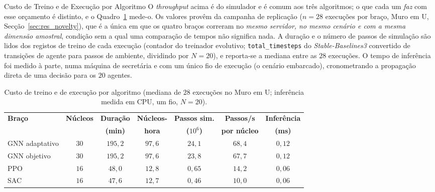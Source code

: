 \documentclass[12pt,reqno, twoside]{amsbook}
\makeatletter
\def\subsection{\@startsection{subsection}{2}%
      \z@{.5\linespacing\@plus.7\linespacing}{.25\linespacing}%
      {\normalfont\bfseries\flushleft}}
\theoremstyle{plain}
\numberwithin{equation}{chapter}
\numberwithin{section}{chapter}
\numberwithin{table}{chapter}
\numberwithin{figure}{chapter}
\makeatother
\begin{document}
\subsection{Custo de Treino e de Execução por Algoritmo}
\label{sec:res_custo_algos}
O \textit{throughput} acima é do simulador e é comum aos três algoritmos; o que cada um \emph{faz} com esse orçamento é distinto, e o Quadro~\ref{tab:res_tempos} mede-o. Os valores provêm da campanha de replicação ($n=28$ execuções por braço, Muro em U, Secção~\ref{sec:res_novelty}), que é a única em que os quatro braços correram no \emph{mesmo servidor, no mesmo cenário e com a mesma dimensão amostral}, condição sem a qual uma comparação de tempos não significa nada. A duração e o número de passos de simulação são lidos dos registos de treino de cada execução (contador do treinador evolutivo; \texttt{total\_timesteps} do \textit{Stable-Baselines3} convertido de transições de agente para passos de ambiente, dividindo por $N=20$), e reporta-se a mediana entre as $28$ execuções. O tempo de inferência foi medido à parte, numa máquina de secretária e com um único fio de execução (o cenário embarcado), cronometrando a propagação direta de uma decisão para os $20$ agentes.

\begin{table}[!htbp]
\centering
\footnotesize
\caption[Custo computacional por algoritmo]{Custo de treino e de execução por algoritmo (mediana de $28$ execuções no Muro em U; inferência medida em CPU, um fio, $N=20$).}
\label{tab:res_tempos}
\renewcommand{\arraystretch}{1.3}
\begin{tabular}{|l|c|c|c|c|c|c|}
\hline
\textbf{Braço} & \textbf{Núcleos} & \textbf{Duração} & \textbf{Núcleos-} & \textbf{Passos sim.} & \textbf{Passos/s} & \textbf{Inferência} \\
 & & \textbf{(min)} & \textbf{hora} & \textbf{($10^6$)} & \textbf{por núcleo} & \textbf{(ms)} \\ \hline
GNN adaptativo & $30$ & $195{,}2$ & $97{,}6$ & $24{,}1$ & $68{,}4$ & $0{,}12$ \\ \hline
GNN objetivo & $30$ & $195{,}2$ & $97{,}6$ & $23{,}8$ & $67{,}7$ & $0{,}12$ \\ \hline
PPO & $16$ & $48{,}0$ & $12{,}8$ & $0{,}65$ & $14{,}2$ & $0{,}06$ \\ \hline
SAC & $16$ & $47{,}6$ & $12{,}7$ & $0{,}46$ & $10{,}0$ & $0{,}06$ \\ \hline
\end{tabular}
\end{table}
\end{document}
